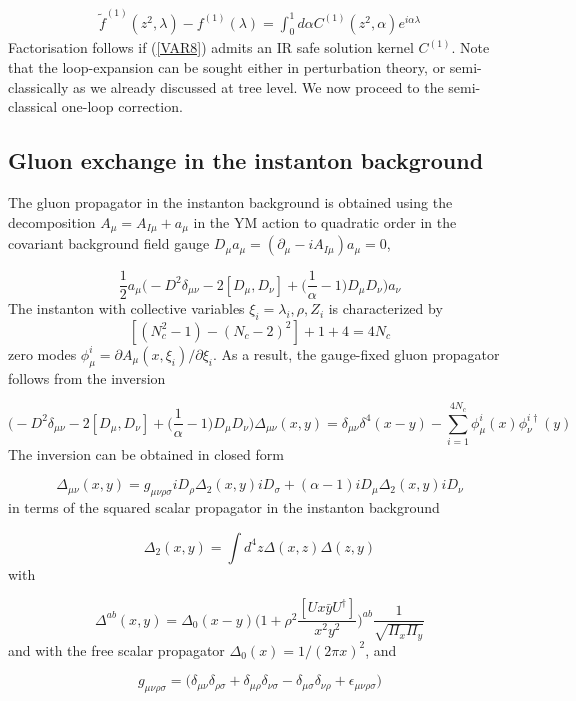 \documentclass[11pt,aps,amsmath,amssymb,nofootinbib,notitlepage,longbibliography]{revtex4-1}
\newcommand{\be}{\begin{equation}}
\newcommand{\ee}{\end{equation}}
\begin{document}
\begin{align}
\label{VAR8}
\tilde f^{(1)}(z^2,\lambda)-f^{(1)}(\lambda)=\int_{0}^1 d\alpha C^{(1)}(z^2,\alpha)e^{i\alpha \lambda}
\end{align}
Factorisation follows if (\ref{VAR8}) admits an IR safe solution kernel $C^{(1)}$. Note that the loop-expansion can be sought
either in perturbation theory, or semi-classically  as we already discussed at tree level. We now proceed to the semi-classical one-loop correction.





\subsection{Gluon exchange in the instanton background}

The gluon propagator in the instanton background is obtained using the decomposition $A_\mu=A_{I\mu}+a_\mu$ in the YM action
to quadratic order in the covariant background field gauge $D_\mu a_\mu=(\partial_\mu-iA_{I\mu}) a_\mu=0$,

\be
\frac 12 a_\mu\bigg(-D^2\delta_{\mu\nu}-2[D_\mu, D_\nu]+\bigg(\frac 1\alpha -1\bigg)D_\mu D_\nu\bigg)a_\nu
\ee
The instanton with collective variables $\xi_i=\lambda_i, \rho, Z_i$ is characterized by
$$[(N_c^2-1)-(N_c-2)^2]+1+4=4N_c$$
zero modes $\phi_{\mu}^i=\partial A_\mu(x, \xi_i)/\partial \xi_i$. As a result, the gauge-fixed gluon propagator follows from the inversion

\be
\label{ONELOOP0}
\bigg(-D^2\delta_{\mu\nu}-2[D_\mu, D_\nu]+\bigg(\frac 1\alpha -1\bigg)D_\mu D_\nu\bigg)\Delta_{\mu\nu}(x,y)=
\delta_{\mu\nu}\delta^4(x-y)-\sum_{i=1}^{4N_c}\phi_\mu^i(x)\phi_\nu^{i\dagger}(y)
\ee
The inversion can be obtained in closed form~\cite{Brown:1977eb}

\be
\label{ONELOOP00}
\Delta_{\mu\nu}(x,y)=g_{\mu\nu\rho\sigma}iD_\rho\Delta_2(x,y)iD_\sigma+(\alpha-1)iD_\mu\Delta_2(x,y)iD_\nu
\ee
in terms of the squared scalar propagator in the instanton background


\be
\Delta_2(x,y)=\int d^4z \Delta(x,z)\Delta(z,y)
\ee
with

\be
\label{ONELOOP000}
\Delta^{ab}(x,y)=\Delta_0(x-y)\bigg(1+\rho^2\frac {[Ux\bar y U^\dagger]}{x^2y^2}\bigg)^{ab}\frac 1{\sqrt{\Pi_x\Pi_y}}
\ee
and with the free scalar propagator $\Delta_0(x)=1/(2\pi x)^2$, and

\be
g_{\mu\nu\rho\sigma}=\bigg(\delta_{\mu\nu}\delta_{\rho\sigma}+\delta_{\mu\rho}\delta_{\nu\sigma}-\delta_{\mu\sigma}\delta_{\nu\rho}+\epsilon_{\mu\nu\rho\sigma}\bigg)
\ee
\end{document}
